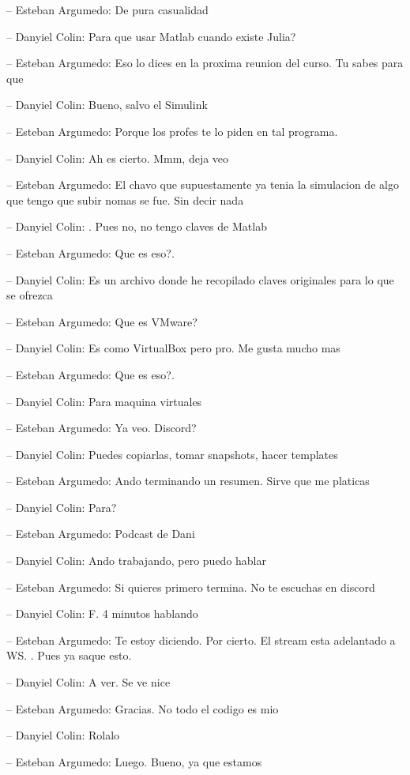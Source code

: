 -- Esteban Argumedo: De pura casualidad

-- Danyiel Colin: Para que usar Matlab cuando existe Julia?

-- Esteban Argumedo: Eso lo dices en la proxima reunion del curso. Tu
sabes para que

-- Danyiel Colin: Bueno, salvo el Simulink

-- Esteban Argumedo: Porque los profes te lo piden en tal programa.

-- Danyiel Colin: Ah es cierto. Mmm, deja veo

-- Esteban Argumedo: El chavo que supuestamente ya tenia la simulacion
de algo que tengo que subir nomas se fue. Sin decir nada

-- Danyiel Colin: . Pues no, no tengo claves de Matlab

-- Esteban Argumedo: Que es eso?.

-- Danyiel Colin: Es un archivo donde he recopilado claves originales
para lo que se ofrezca

-- Esteban Argumedo: Que es VMware?

-- Danyiel Colin: Es como VirtualBox pero pro. Me gusta mucho mas

-- Esteban Argumedo: Que es eso?.

-- Danyiel Colin: Para maquina virtuales

-- Esteban Argumedo: Ya veo. Discord?

-- Danyiel Colin: Puedes copiarlas, tomar snapshots, hacer templates

-- Esteban Argumedo: Ando terminando un resumen. Sirve que me platicas

-- Danyiel Colin: Para?

-- Esteban Argumedo: Podcast de Dani

-- Danyiel Colin: Ando trabajando, pero puedo hablar

-- Esteban Argumedo: Si quieres primero termina. No te escuchas en
discord

-- Danyiel Colin: F. 4 minutos hablando

-- Esteban Argumedo: Te estoy diciendo. Por cierto. El stream esta
adelantado a WS. . Pues ya saque esto.

-- Danyiel Colin: A ver. Se ve nice

-- Esteban Argumedo: Gracias. No todo el codigo es mio

-- Danyiel Colin: Rolalo

-- Esteban Argumedo: Luego. Bueno, ya que estamos

